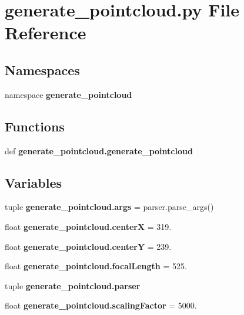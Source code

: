 \section{generate\-\_\-pointcloud.\-py \-File \-Reference}
\label{generate__pointcloud_8py}
\subsection*{\-Namespaces}
\begin{DoxyCompactItemize}
\item 
namespace {\bf generate\-\_\-pointcloud}
\end{DoxyCompactItemize}
\subsection*{\-Functions}
\begin{DoxyCompactItemize}
\item 
def {\bf generate\-\_\-pointcloud.\-generate\-\_\-pointcloud}
\end{DoxyCompactItemize}
\subsection*{\-Variables}
\begin{DoxyCompactItemize}
\item 
tuple {\bf generate\-\_\-pointcloud.\-args} = parser.\-parse\-\_\-args()
\item 
float {\bf generate\-\_\-pointcloud.\-center\-X} = 319.
\item 
float {\bf generate\-\_\-pointcloud.\-center\-Y} = 239.
\item 
float {\bf generate\-\_\-pointcloud.\-focal\-Length} = 525.
\item 
tuple {\bf generate\-\_\-pointcloud.\-parser}
\item 
float {\bf generate\-\_\-pointcloud.\-scaling\-Factor} = 5000.
\end{DoxyCompactItemize}
